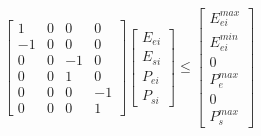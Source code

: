 \documentclass[11pt]{article} %
\begin{document}
\begin{align} 
    \begin{bmatrix}
        1 & 0 & 0 & 0\\
        -1 & 0 & 0 & 0\\
        0 & 0 & -1 & 0\\
        0 & 0 & 1 & 0\\
        0 & 0 & 0 & -1\\
        0 & 0 & 0 & 1
    \end{bmatrix} 
    \begin{bmatrix}
        E_{ei}\\
        E_{si}\\
        P_{ei}\\
        P_{si}
    \end{bmatrix} \leq
    \begin{bmatrix}
        E_{ei}^{max}\\
        E_{ei}^{min}\\
        0\\
        P_{e}^{max}\\
        0\\
        P_{s}^{max}
    \end{bmatrix}
\end{align}
\end{document}
